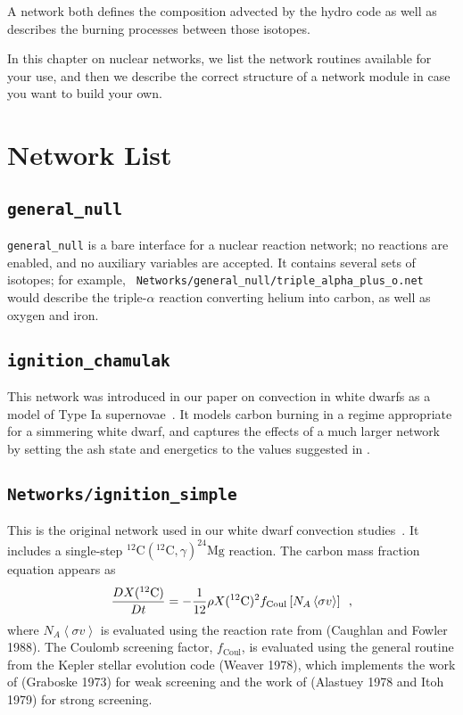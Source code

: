 
A network both defines the composition advected by the hydro code
as well as describes the burning processes between those isotopes.

In this chapter on nuclear networks, we list the network routines
available for your use, and then we describe the correct structure of
a network module in case you want to build your own.

\section{Network List}

\subsection{{\tt general\_null}}

{\tt general\_null} is a bare interface for a nuclear reaction
network; no reactions are enabled, and no auxiliary variables are
accepted. It contains several sets of isotopes; for example, {\tt
  Networks/general\_null/triple\_alpha\_plus\_o.net} would describe
the triple-$\alpha$ reaction converting helium into carbon, as well as
oxygen and iron.

\subsection{{\tt ignition\_chamulak}}

This network was introduced in our paper on convection in white dwarfs
as a model of Type Ia supernovae~\cite{wdconvect}.  It models
carbon burning in a regime appropriate for a simmering white dwarf,
and captures the effects of a much larger network by setting the ash
state and energetics to the values suggested in \cite{chamulak:2008}.


\subsection{{\tt Networks/ignition\_simple}}

This is the original network used in our white dwarf convection
studies~\cite{lowMach4}.  It includes a single-step
$^{12}\mathrm{C}(^{12}\mathrm{C},\gamma)^{24}\mathrm{Mg}$ reaction.
The carbon mass fraction equation appears as
\begin{equation}
\frac{D X(^{12}\mathrm{C})}{Dt} = - \frac{1}{12} \rho X(^{12}\mathrm{C})^2
    f_\mathrm{Coul} \left [N_A \left <\sigma v \right > \right]\enskip,
\end{equation}
where $N_A \left <\sigma v\right>$ is evaluated using the reaction
rate from (Caughlan and Fowler 1988).  The Coulomb screening factor,
$f_\mathrm{Coul}$, is evaluated using the general routine from the
Kepler stellar evolution code (Weaver 1978), which implements the work
of (Graboske 1973) for weak screening and the work of (Alastuey 1978
and Itoh 1979) for strong screening.



